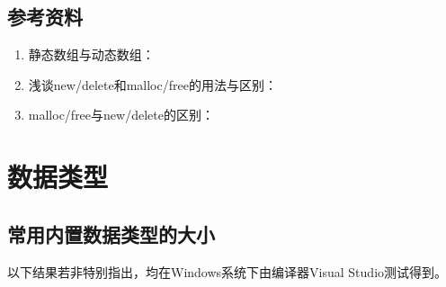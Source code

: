 \documentclass[letterpaper,10pt,english]{sphinxmanual}
\begin{document}
\subsection{参考资料}
\label{\detokenize{cpp/02_array:id10}}\begin{enumerate}
\item {} 
静态数组与动态数组：

\end{enumerate}
\begin{quote}

\end{quote}
\begin{enumerate}
\setcounter{enumi}{1}
\item {} 
浅谈new/delete和malloc/free的用法与区别：

\end{enumerate}
\begin{quote}

\end{quote}
\begin{enumerate}
\setcounter{enumi}{2}
\item {} 
malloc/free与new/delete的区别：

\end{enumerate}
\begin{quote}

\end{quote}


\section{数据类型}
\label{\detokenize{cpp/03_typeSize::doc}}\label{\detokenize{cpp/03_typeSize:id1}}

\subsection{常用内置数据类型的大小}
\label{\detokenize{cpp/03_typeSize:id2}}
以下结果若非特别指出，均在Windows系统下由编译器Visual Studio测试得到。
\end{document}
